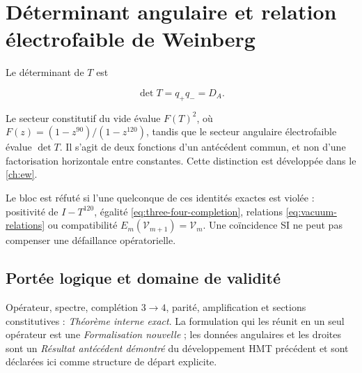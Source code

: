 \section{Déterminant angulaire et relation électrofaible de Weinberg}

Le déterminant de \(T\) est

\begin{equation}
\det T=q_+q_-=D_A.
\label{eq:detT}
\end{equation}

Le secteur constitutif du vide évalue \(F(T)^2\), où
\(F(z)=(1-z^{90})/(1-z^{120})\), tandis que le secteur angulaire
électrofaible évalue \(\det T\). Il s'agit de deux fonctions d'un
antécédent commun, et non d'une factorisation horizontale entre constantes.
Cette distinction est développée dans le \cref{ch:ew}.

\begin{remark}
Le bloc est réfuté si l'une quelconque de ces identités exactes est violée :
positivité de \(I-T^{120}\), égalité
\cref{eq:three-four-completion}, relations \cref{eq:vacuum-relations} ou
compatibilité \(E_m(\mathcal V_{m+1})=\mathcal V_m\). Une coïncidence SI
ne peut pas compenser une défaillance opératorielle.
\end{remark}

\subsection*{Portée logique et domaine de validité}
Opérateur, spectre, complétion \(3\to4\), parité, amplification et sections constitutives : \emph{Théorème interne exact}. La formulation qui les réunit en un seul opérateur est une \emph{Formalisation nouvelle} ; les données angulaires et les droites sont un \emph{Résultat antécédent démontré} du développement HMT précédent et sont déclarées ici comme structure de départ explicite.

